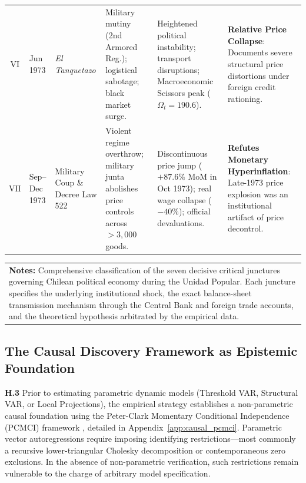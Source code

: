 \begin{table}[htbp]
{\begin{tabular}{cll>{\raggedright\arraybackslash}p{4.5cm}>{\raggedright\arraybackslash}p{4.5cm}>{\raggedright\arraybackslash}p{4.2cm}}
$\mathrm{VI}$ & Jun 1973 & \textit{El Tanquetazo} & Military mutiny (2nd Armored Reg.); logistical sabotage; black market surge. & Heightened political instability; transport disruptions; Macroeconomic Scissors peak ($\Omega_t = 190.6$). & \textbf{Relative Price Collapse}: Documents severe structural price distortions under foreign credit rationing. \\
$\mathrm{VII}$ & Sep--Dec 1973 & Military Coup \& Decree Law 522 & Violent regime overthrow; military junta abolishes price controls across $>3,000$ goods. & Discontinuous price jump ($+87.6\%$ MoM in Oct 1973); real wage collapse ($-40\%$); official devaluations. & \textbf{Refutes Monetary Hyperinflation}: Late-1973 price explosion was an institutional artifact of price decontrol. \\
\bottomrule
\end{tabular}%
}
\begin{tabular}{p{}}
\vspace{0.2em}
\footnotesize \textbf{Notes:} Comprehensive classification of the seven decisive critical junctures governing Chilean political economy during the Unidad Popular. Each juncture specifies the underlying institutional shock, the exact balance-sheet transmission mechanism through the Central Bank and foreign trade accounts, and the theoretical hypothesis arbitrated by the empirical data.
\end{tabular}
\end{table}

\subsection{The Causal Discovery Framework as Epistemic Foundation}
\label{app:pcmci_gate_synthesis}

\textbf{H.3} Prior to estimating parametric dynamic models (Threshold VAR, Structural VAR, or Local Projections), the empirical strategy establishes a non-parametric causal foundation using the Peter-Clark Momentary Conditional Independence (PCMCI) framework \citep{Runge2019}, detailed in Appendix~\ref{app:causal_pcmci}. Parametric vector autoregressions require imposing identifying restrictions---most commonly a recursive lower-triangular Cholesky decomposition or contemporaneous zero exclusions. In the absence of non-parametric verification, such restrictions remain vulnerable to the charge of arbitrary model specification.


